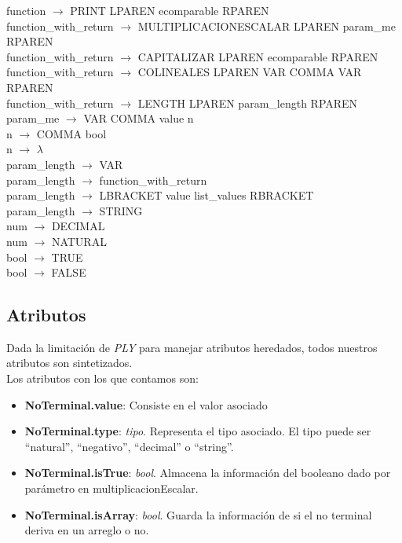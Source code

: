 \documentclass[10pt,a4paper]{article}
\begin{document}
function $\rightarrow$ PRINT LPAREN ecomparable RPAREN \\
function\_with\_return $\rightarrow$ MULTIPLICACIONESCALAR LPAREN param\_me RPAREN \\
function\_with\_return $\rightarrow$ CAPITALIZAR LPAREN ecomparable RPAREN \\
function\_with\_return $\rightarrow$ COLINEALES LPAREN VAR COMMA VAR RPAREN \\
function\_with\_return $\rightarrow$ LENGTH LPAREN param\_length RPAREN \\
param\_me $\rightarrow$ VAR COMMA value n \\
n $\rightarrow$ COMMA bool \\
n $\rightarrow$ $\lambda$ \\
param\_length $\rightarrow$ VAR \\
param\_length $\rightarrow$ function\_with\_return \\
param\_length $\rightarrow$ LBRACKET value list\_values RBRACKET \\
param\_length $\rightarrow$ STRING \\
num $\rightarrow$ DECIMAL \\
num $\rightarrow$ NATURAL \\
bool $\rightarrow$ TRUE \\
bool $\rightarrow$ FALSE \\

\newpage
\subsection{Atributos}

Dada la limitación de \textit{PLY} para manejar atributos heredados, todos nuestros atributos son sintetizados.\\

Los atributos con los que contamos son:
\begin{itemize}
\item \textbf{NoTerminal.value}: Consiste en el valor asociado
\item \textbf{NoTerminal.type}: \textit{tipo}. Representa el tipo asociado. El tipo puede ser ``natural'', ``negativo'', ``decimal'' o ``string''.
\item \textbf{NoTerminal.isTrue}: \textit{bool}. Almacena la información del booleano dado por parámetro en multiplicacionEscalar.
\item \textbf{NoTerminal.isArray}: \textit{bool}. Guarda la información de si el no terminal deriva en un arreglo o no.
\end{itemize}
\end{document}
